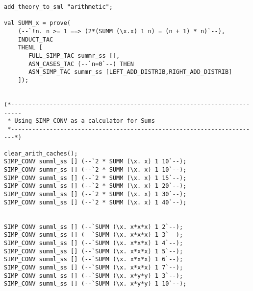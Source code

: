 \begin{verbatim}
add_theory_to_sml "arithmetic";

val SUMM_x = prove(
    (--`!n. n >= 1 ==> (2*(SUMM (\x.x) 1 n) = (n + 1) * n)`--),
    INDUCT_TAC
    THENL [
       FULL_SIMP_TAC summr_ss [],
       ASM_CASES_TAC (--`n=0`--) THEN
       ASM_SIMP_TAC summr_ss [LEFT_ADD_DISTRIB,RIGHT_ADD_DISTRIB]
    ]);


(*-------------------------------------------------------------------------
 * Using SIMP_CONV as a calculator for Sums
 *-----------------------------------------------------------------------*)

clear_arith_caches();
SIMP_CONV summl_ss [] (--`2 * SUMM (\x. x) 1 10`--);
SIMP_CONV summr_ss [] (--`2 * SUMM (\x. x) 1 10`--);
SIMP_CONV summl_ss [] (--`2 * SUMM (\x. x) 1 15`--);
SIMP_CONV summl_ss [] (--`2 * SUMM (\x. x) 1 20`--);
SIMP_CONV summl_ss [] (--`2 * SUMM (\x. x) 1 30`--);
SIMP_CONV summl_ss [] (--`2 * SUMM (\x. x) 1 40`--);


SIMP_CONV summl_ss [] (--`SUMM (\x. x*x*x) 1 2`--);
SIMP_CONV summl_ss [] (--`SUMM (\x. x*x*x) 1 3`--);
SIMP_CONV summl_ss [] (--`SUMM (\x. x*x*x) 1 4`--);
SIMP_CONV summl_ss [] (--`SUMM (\x. x*x*x) 1 5`--);
SIMP_CONV summl_ss [] (--`SUMM (\x. x*x*x) 1 6`--);
SIMP_CONV summl_ss [] (--`SUMM (\x. x*x*x) 1 7`--);
SIMP_CONV summl_ss [] (--`SUMM (\x. x*y*y) 1 3`--);
SIMP_CONV summl_ss [] (--`SUMM (\x. x*y*y) 1 10`--);
\end{verbatim}


